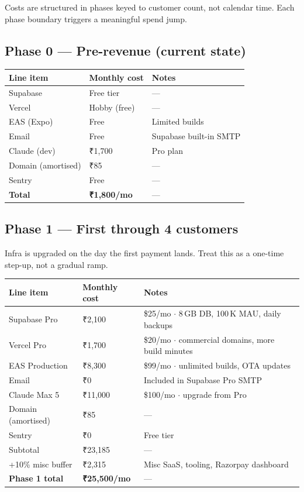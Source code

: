 \documentclass[12pt,a4paper]{article}
\newcommand{\tild}{\raisebox{0.17ex}{$\scriptstyle\sim$}}
\begin{document}
Costs are structured in phases keyed to customer count, not calendar time.
Each phase boundary triggers a meaningful spend jump.

\subsection{Phase 0 --- Pre-revenue (current state)}

\begin{tabular}{@{}L{6cm}R{3.5cm}L{5cm}@{}}
  \toprule
  \textbf{Line item} & \textbf{Monthly cost} & \textbf{Notes} \\
  \midrule
  Supabase           & Free tier    & --- \\
  Vercel             & Hobby (free) & --- \\
  EAS (Expo)         & Free         & Limited builds \\
  Email              & Free         & Supabase built-in SMTP \\
  Claude (dev)       & ₹1,700       & Pro plan \\
  Domain (amortised) & ₹85          & --- \\
  Sentry             & Free         & --- \\
  \midrule
  \textbf{Total}     & \textbf{\tild{}₹1,800/mo} & --- \\
  \bottomrule
\end{tabular}

\subsection{Phase 1 --- First through \tild{}4 customers}

Infra is upgraded on the day the first payment lands.
Treat this as a one-time step-up, not a gradual ramp.

\begin{tabular}{@{}L{5cm}R{3cm}L{7cm}@{}}
  \toprule
  \textbf{Line item} & \textbf{Monthly cost} & \textbf{Notes} \\
  \midrule
  Supabase Pro          & ₹2,100   & \$25/mo $\cdot$ 8\,GB DB, 100\,K MAU, daily backups \\
  Vercel Pro            & ₹1,700   & \$20/mo $\cdot$ commercial domains, more build minutes \\
  EAS Production        & ₹8,300   & \$99/mo $\cdot$ unlimited builds, OTA updates \\
  Email                 & ₹0       & Included in Supabase Pro SMTP \\
  Claude Max 5\texttimes{}& ₹11,000  & \$100/mo $\cdot$ upgrade from Pro \\
  Domain (amortised)    & ₹85      & --- \\
  Sentry                & ₹0       & Free tier \\
  \midrule
  Subtotal              & ₹23,185  & --- \\
  +10\% misc buffer     & ₹2,315   & Misc SaaS, tooling, Razorpay dashboard \\
  \midrule
  \textbf{Phase 1 total} & \textbf{\tild{}₹25,500/mo} & --- \\
  \bottomrule
\end{tabular}
\end{document}

